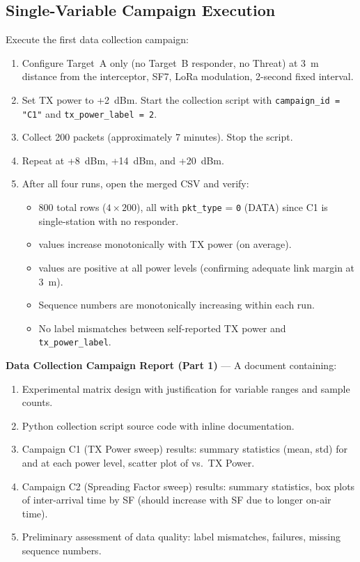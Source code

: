 \documentclass[11pt,letterpaper]{article}
\begin{document}
	\subsection{Single-Variable Campaign Execution}

	\begin{tcolorbox}[infobox={Exercise: TX Power Sweep (Campaign C1)}]
		Execute the first data collection campaign:
		\begin{enumerate}
			\item Configure Target~A only (no Target~B responder, no Threat) at 3~m distance from the interceptor, SF7, LoRa modulation, 2-second fixed interval.
			\item Set TX power to +2~dBm. Start the collection script with \texttt{campaign\_id = "C1"} and \texttt{tx\_power\_label = 2}.
			\item Collect 200 packets (approximately 7 minutes). Stop the script.
			\item Repeat at +8~dBm, +14~dBm, and +20~dBm.
			\item After all four runs, open the merged CSV and verify:
			\begin{itemize}
				\item 800 total rows ($4 \times 200$), all with \texttt{pkt\_type} = \texttt{0} (DATA) since C1 is single-station with no responder.
				\item \RSSI{} values increase monotonically with TX power (on average).
				\item \SNR{} values are positive at all power levels (confirming adequate link margin at 3~m).
				\item Sequence numbers are monotonically increasing within each run.
				\item No label mismatches between self-reported TX power and \texttt{tx\_power\_label}.
			\end{itemize}
		\end{enumerate}
	\end{tcolorbox}

	\begin{tcolorbox}[deliverable={Session 11 Deliverable}]
		\textbf{Data Collection Campaign Report (Part 1)} --- A document containing:
		\begin{enumerate}
			\item Experimental matrix design with justification for variable ranges and sample counts.
			\item Python collection script source code with inline documentation.
			\item Campaign C1 (TX Power sweep) results: summary statistics (mean, std) for \RSSI{} and \SNR{} at each power level, scatter plot of \RSSI{} vs.\ TX Power.
			\item Campaign C2 (Spreading Factor sweep) results: summary statistics, box plots of inter-arrival time by SF (should increase with SF due to longer on-air time).
			\item Preliminary assessment of data quality: label mismatches, \CRC{} failures, missing sequence numbers.
		\end{enumerate}
	\end{tcolorbox}
\end{document}
